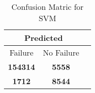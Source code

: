 \begin{table}[] 
\caption{Confusion Matric for SVM} 
\label{Table: Prediction Accuracy-NoneSVM80.0EKF-ignoreReflection-Reflection} 
\centering 
\begin{tabular} 
 {@{}ccc@{}} 
\toprule 
\multicolumn{2}{c}{\textbf{Predicted}}
 \\ \midrule 
\multicolumn{1}{|c|}{Failure} & 
\multicolumn{1}{c|}{No Failure}
 \\ \midrule 
\multicolumn{1}{|c|}{\color{green}\textbf{154314}} & 
\multicolumn{1}{c|}{\color{red}\textbf{5558}}
 \\ \midrule 
\multicolumn{1}{|c|}{\color{red}\textbf{1712}} & 
\multicolumn{1}{c|}{\color{green}\textbf{8544}}
 \\ \bottomrule 
\end{tabular} 
\end{table} 
